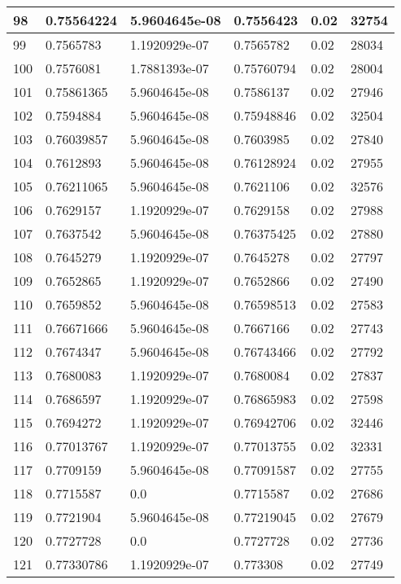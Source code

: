 \begin{longtable}{|l|l|l|l|l|l|}
98 & 0.75564224 & 5.9604645e-08 & 0.7556423 & 0.02 & 32754 \\ \hline 
99 & 0.7565783 & 1.1920929e-07 & 0.7565782 & 0.02 & 28034 \\ \hline 
100 & 0.7576081 & 1.7881393e-07 & 0.75760794 & 0.02 & 28004 \\ \hline 
101 & 0.75861365 & 5.9604645e-08 & 0.7586137 & 0.02 & 27946 \\ \hline 
102 & 0.7594884 & 5.9604645e-08 & 0.75948846 & 0.02 & 32504 \\ \hline 
103 & 0.76039857 & 5.9604645e-08 & 0.7603985 & 0.02 & 27840 \\ \hline 
104 & 0.7612893 & 5.9604645e-08 & 0.76128924 & 0.02 & 27955 \\ \hline 
105 & 0.76211065 & 5.9604645e-08 & 0.7621106 & 0.02 & 32576 \\ \hline 
106 & 0.7629157 & 1.1920929e-07 & 0.7629158 & 0.02 & 27988 \\ \hline 
107 & 0.7637542 & 5.9604645e-08 & 0.76375425 & 0.02 & 27880 \\ \hline 
108 & 0.7645279 & 1.1920929e-07 & 0.7645278 & 0.02 & 27797 \\ \hline 
109 & 0.7652865 & 1.1920929e-07 & 0.7652866 & 0.02 & 27490 \\ \hline 
110 & 0.7659852 & 5.9604645e-08 & 0.76598513 & 0.02 & 27583 \\ \hline 
111 & 0.76671666 & 5.9604645e-08 & 0.7667166 & 0.02 & 27743 \\ \hline 
112 & 0.7674347 & 5.9604645e-08 & 0.76743466 & 0.02 & 27792 \\ \hline 
113 & 0.7680083 & 1.1920929e-07 & 0.7680084 & 0.02 & 27837 \\ \hline 
114 & 0.7686597 & 1.1920929e-07 & 0.76865983 & 0.02 & 27598 \\ \hline 
115 & 0.7694272 & 1.1920929e-07 & 0.76942706 & 0.02 & 32446 \\ \hline 
116 & 0.77013767 & 1.1920929e-07 & 0.77013755 & 0.02 & 32331 \\ \hline 
117 & 0.7709159 & 5.9604645e-08 & 0.77091587 & 0.02 & 27755 \\ \hline 
118 & 0.7715587 & 0.0 & 0.7715587 & 0.02 & 27686 \\ \hline 
119 & 0.7721904 & 5.9604645e-08 & 0.77219045 & 0.02 & 27679 \\ \hline 
120 & 0.7727728 & 0.0 & 0.7727728 & 0.02 & 27736 \\ \hline 
121 & 0.77330786 & 1.1920929e-07 & 0.773308 & 0.02 & 27749 \\ \hline 

\end{longtable}
